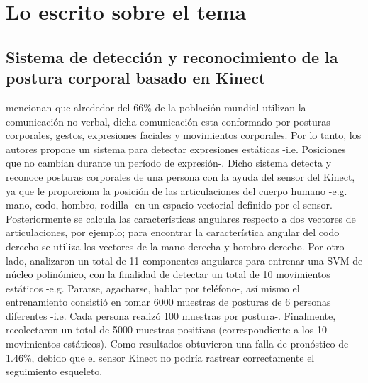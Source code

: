 \newpage 
\section{Lo escrito sobre el tema} \label{tr}
\subsection{Sistema de detecci\'on y reconocimiento de la postura corporal basado en Kinect} \label{tr:1}
 mencionan que alrededor del 66\% de la poblaci\'on mundial  utilizan la comunicaci\'on no verbal, dicha comunicaci\'on esta conformado por posturas corporales, gestos, expresiones faciales y movimientos corporales. Por lo tanto, los autores propone un sistema para detectar expresiones est\'aticas -i.e. Posiciones que no cambian durante un per\'iodo de expresi\'on-.
\medbreak
Dicho sistema detecta y reconoce posturas corporales de una persona con la ayuda del sensor del Kinect, ya que le proporciona la posici\'on de las articulaciones del cuerpo humano -e.g. mano, codo, hombro, rodilla- en un espacio vectorial definido por el sensor. Posteriormente se calcula las caracter\'isticas angulares respecto a dos vectores de articulaciones, por ejemplo; para encontrar la caracter\'istica angular del codo derecho se utiliza los vectores de la mano derecha y hombro derecho.
\medbreak
Por otro lado,  analizaron un total de 11 componentes angulares para entrenar una \acrfull{SVM} de n\'ucleo polin\'omico, con la finalidad de detectar un total de 10 movimientos est\'aticos -e.g. Pararse, agacharse, hablar por tel\'efono-, as\'i mismo el entrenamiento consisti\'o en tomar 6000 muestras de posturas de 6 personas diferentes -i.e. Cada persona realiz\'o 100 muestras por postura-.
\medbreak
Finalmente,  recolectaron un total de 5000 muestras positivas (correspondiente a los 10 movimientos est\'aticos).  Como resultados obtuvieron una falla de pron\'ostico de 1.46\%, debido que el sensor Kinect no podr\'ia rastrear correctamente el seguimiento esqueleto.
